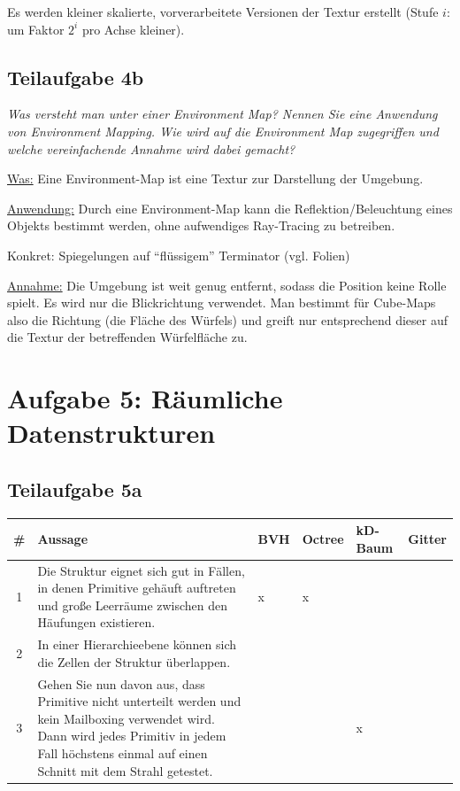 \documentclass[a4paper]{scrartcl}
\begin{document}
Es werden kleiner skalierte, vorverarbeitete Versionen der Textur erstellt
(Stufe $i$: um Faktor $2^i$ pro Achse kleiner).

\subsection*{Teilaufgabe 4b}
\textit{Was versteht man unter einer Environment Map? Nennen Sie eine Anwendung
von Environment Mapping. Wie wird auf die Environment Map zugegriffen und
welche vereinfachende Annahme wird dabei gemacht?}

\underline{Was:} Eine Environment-Map ist eine Textur zur Darstellung der Umgebung.

\underline{Anwendung:} Durch eine Environment-Map kann die
Reflektion/Beleuchtung eines Objekts bestimmt werden, ohne aufwendiges
Ray-Tracing zu betreiben.

Konkret: Spiegelungen auf \enquote{flüssigem} Terminator (vgl. Folien)

\underline{Annahme:} Die Umgebung ist weit genug entfernt, sodass die Position
keine Rolle spielt. Es wird nur die Blickrichtung verwendet. Man bestimmt für
Cube-Maps also die Richtung (die Fläche des Würfels) und greift nur
entsprechend dieser auf die Textur der betreffenden Würfelfläche zu.

\section*{Aufgabe 5: Räumliche Datenstrukturen}
\subsection*{Teilaufgabe 5a}
\begin{tabular}{cp{8cm}llll}\toprule
\#& Aussage                                                                                                                                                                                                & BVH     & Octree & kD-Baum & Gitter \\\midrule
1 & Die Struktur eignet sich gut in Fällen, in denen Primitive gehäuft auftreten und große Leerräume zwischen den Häufungen existieren.                                                                    & x       & x      & ~       & ~      \\
2 & In einer Hierarchieebene können sich die Zellen der Struktur überlappen.                                                                                                                               & ~       & ~      & ~       & ~      \\
3 & Gehen Sie nun davon aus, dass Primitive nicht unterteilt werden und kein Mailboxing verwendet wird. Dann wird jedes Primitiv in jedem Fall höchstens einmal auf einen Schnitt mit dem Strahl getestet. & ~       & ~      & x       & ~      \\\bottomrule
\end{tabular}
\end{document}

